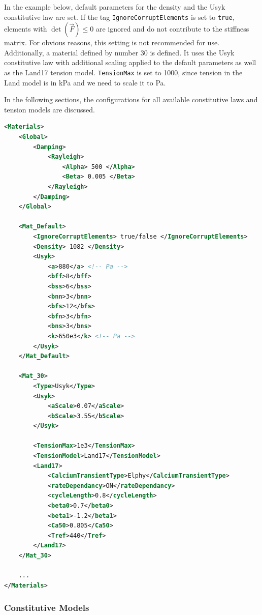 In the example below, default parameters for the density and the Usyk constitutive law are set.
If the tag \verb|IgnoreCorruptElements| is set to \verb|true|, elements with $\det(\vec F) \leq 0$ are ignored and do not contribute to the stiffness matrix.
For obvious reasons, this setting is not recommended for use.
Additionally, a material defined by number 30 is defined.
It uses the Usyk constitutive law with additional scaling applied to the default parameters as well as the Land17 tension model.
\verb|TensionMax| is set to 1000, since tension in the Land model is in \si{kPa} and we need to scale it to \si{Pa}.

In the following sections, the configurations for all available constitutive laws and tension models are discussed.

\begin{lstlisting}[language=XML,caption=.xml settings for material definitions]
<Materials>
    <Global>
        <Damping>
            <Rayleigh>
                <Alpha> 500 </Alpha>
                <Beta> 0.005 </Beta>
            </Rayleigh>
        </Damping>
    </Global>

    <Mat_Default>
        <IgnoreCorruptElements> true/false </IgnoreCorruptElements>
        <Density> 1082 </Density>
        <Usyk>
            <a>880</a> <!-- Pa -->
            <bff>8</bff>
            <bss>6</bss>
            <bnn>3</bnn>
            <bfs>12</bfs>
            <bfn>3</bfn>
            <bns>3</bns>
            <k>650e3</k> <!-- Pa -->
        </Usyk>
    </Mat_Default>
    
    <Mat_30> 
        <Type>Usyk</Type>
        <Usyk>
            <aScale>0.07</aScale>
            <bScale>3.55</bScale>
        </Usyk>

        <TensionMax>1e3</TensionMax>
        <TensionModel>Land17</TensionModel>
        <Land17>
            <CalciumTransientType>Elphy</CalciumTransientType>
            <rateDependancy>ON</rateDependancy>
            <cycleLength>0.8</cycleLength>
            <beta0>0.7</beta0>
            <beta1>-1.2</beta1>
            <Ca50>0.805</Ca50>
            <Tref>440</Tref>
        </Land17>
    </Mat_30>
    
    ...
</Materials>
\end{lstlisting}

\subsubsection{Constitutive Models}

